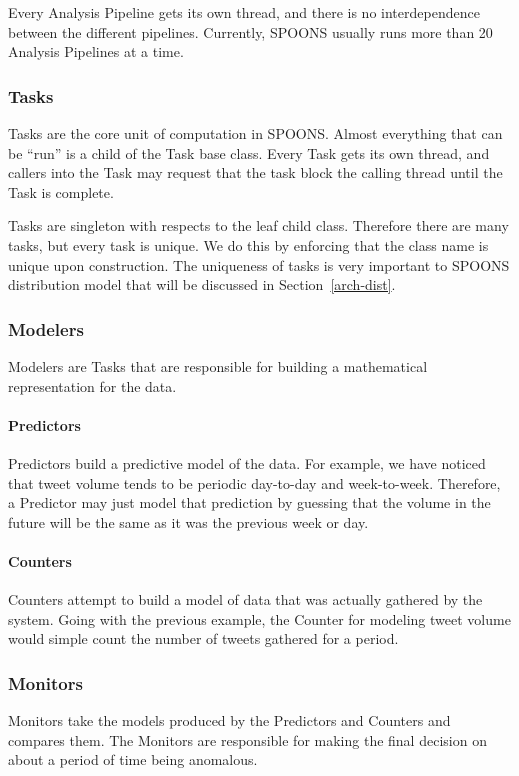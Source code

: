 \documentclass[12pt]{ucthesis}
\begin{document}
Every Analysis Pipeline gets its own thread, and there is no interdependence between the different pipelines.
Currently, SPOONS usually runs more than 20 Analysis Pipelines at a time.

\subsubsection{Tasks}
\label{arch-tasks}
Tasks are the core unit of computation in SPOONS. Almost everything that can be ``run'' is a child of the Task base
class. Every Task gets its own thread, and callers into the Task may request that the task block the calling thread
until the Task is complete.

Tasks are singleton with respects to the leaf child class. Therefore there are many tasks, but every task is
unique. We do this by enforcing that the class name is unique upon construction. The uniqueness of tasks is very
important to SPOONS distribution model that will be discussed in Section~\ref{arch-dist}.

\subsubsection{Modelers}
\label{arch-modelers}
Modelers are Tasks that are responsible for building a mathematical representation for the data.

\paragraph{Predictors}
\label{arch-predictors}
Predictors build a predictive model of the data. For example, we have noticed that tweet volume tends to be
periodic day-to-day and week-to-week. Therefore, a Predictor may just model that prediction by guessing that the volume
in the future will be the same as it was the previous week or day.

\paragraph{Counters}
\label{arch-counters}
Counters attempt to build a model of data that was actually gathered by the system. Going with the previous example,
the Counter for modeling tweet volume would simple count the number of tweets gathered for a period.

\subsubsection{Monitors}
\label{arch-monitors}
Monitors take the models produced by the Predictors and Counters and compares them. The Monitors are responsible for
making the final decision on about a period of time being anomalous.
\end{document}
